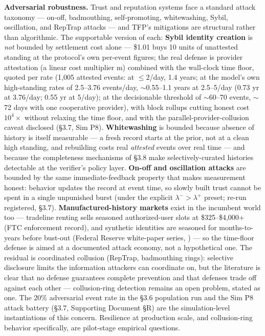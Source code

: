 \documentclass[11pt,twocolumn]{article}
\begin{document}
\textbf{Adversarial robustness.} Trust and reputation systems face a
standard attack taxonomy --- on-off, badmouthing, self-promoting,
whitewashing, Sybil, oscillation, and RepTrap attacks
\citep{hoffman2009,jalaly2023} --- and TFP's mitigations are structural
rather than algorithmic. The supportable version of each:
\textbf{Sybil identity creation} \citep{douceur2002} is \emph{not}
bounded by settlement cost alone --- \$1.01 buys 10 units of unattested
standing at the protocol's own per-event figures; the real defense is
provider attestation (a linear cost multiplier m) combined with the
wall-clock time floor, quoted per rate (1,005 attested events: at
\(\leq 2\)/day, 1.4 years; at the model's own high-standing rates of
2.5--3.76 events/day, \(\sim\)0.55--1.1 years at 2.5--5/day (0.73 yr at 3.76/day; 0.55 yr at 5/day); at the decisionable
threshold of \(\sim\)60--70 events, \(\sim\)72 days with one
cooperative provider), with block rollups cutting honest cost \(10^{4}\times\)
without relaxing the time floor, and with the
parallel-provider-collusion caveat disclosed (§3.7, Sim P8).
\textbf{Whitewashing} is bounded because absence of history is itself
measurable --- a fresh record starts at the prior, not at a clean high
standing, and rebuilding costs real \emph{attested} events over real
time --- and because the completeness mechanisms of §3.8 make
selectively-curated histories detectable at the verifier's policy layer.
\textbf{On-off and oscillation attacks} are bounded by the same
immediate-feedback property that makes measurement honest: behavior
updates the record at event time, so slowly built trust cannot be spent
in a single unpunished burst (under the explicit
\(\lambda^{-} > \lambda^{+}\) preset; re-run registered, §3.7).
\textbf{Manufactured-history markets} exist in the incumbent world too
--- tradeline renting sells seasoned authorized-user slots at
\$325--\$4,000+ (FTC enforcement record), and synthetic identities are
seasoned for months-to-years before bust-out (Federal Reserve
white-paper series, \citeyear{fed2019}) --- so the time-floor defense is
aimed at a documented attack economy, not a hypothetical one. The residual is coordinated collusion (RepTrap, badmouthing rings):
selective disclosure limits the information attackers can coordinate on,
but the literature is clear that no defense guarantees complete
prevention and that defenses trade off against each other
\citep{jalaly2023} --- collusion-ring detection remains an open problem,
stated as one. The 20\% adversarial event rate in the §3.6 population
run and the Sim P8 attack battery (§3.7, Supporting Document §R) are the
simulation-level instantiations of this concern. Resilience at
production scale, and collusion-ring behavior specifically, are
pilot-stage empirical questions.
\end{document}
